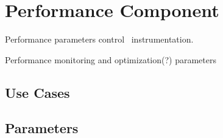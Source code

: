 
\section{Performance Component} \label{s:component-performance}
Performance parameters control \lcaperf\ instrumentation.

Performance monitoring and optimization(?) parameters

\subsection{Use Cases}
\subsection{Parameters}
